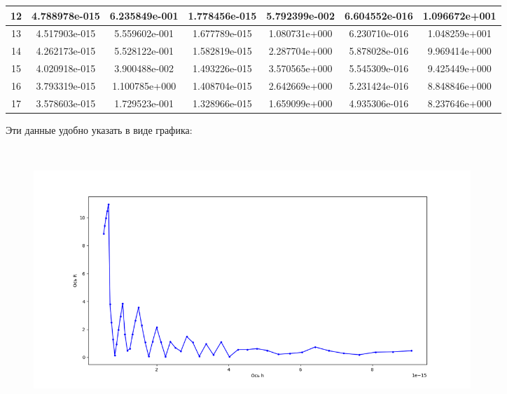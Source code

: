 \documentclass[a4paper,12pt]{article}
\begin{document}
\begin{table}[h]
\begin{center}
\begin{tabular}{|c|c|c|c|c|c|c|}
      12&4.788978e-015&6.235849e-001&1.778456e-015&5.792399e-002&6.604552e-016&1.096672e+001\\
      \hline
      13&4.517903e-015&5.559602e-001&1.677789e-015&1.080731e+000&6.230710e-016&1.048259e+001\\
      \hline
      14&4.262173e-015&5.528122e-001&1.582819e-015&2.287704e+000&5.878028e-016&9.969414e+000\\
      \hline
      15&4.020918e-015&3.900488e-002&1.493226e-015&3.570565e+000&5.545309e-016&9.425449e+000\\
      \hline
      16&3.793319e-015&1.100785e+000&1.408704e-015&2.642669e+000&5.231424e-016&8.848846e+000\\
      \hline
      17&3.578603e-015&1.729523e-001&1.328966e-015&1.659099e+000&4.935306e-016&8.237646e+000\\
      \hline
      \end{tabular}
    \end{center}
  \end{table}

Эти данные удобно указать в виде графика:
      \begin{figure}[H]
        \centering
          \includegraphics[width=0.8\textwidth, height=10cm]{DEF_3.png}
      \end{figure}
      
\newpage
\end{document}
